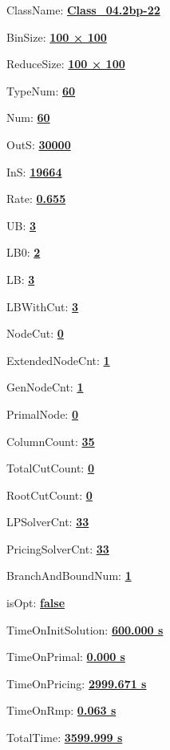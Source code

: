 \documentclass[11pt]{article}
\begin{document}
\pagestyle{empty}


ClassName: \underline{\textbf{Class_04.2bp-22}}
\par
BinSize: \underline{\textbf{100 × 100}}
\par
ReduceSize: \underline{\textbf{100 × 100}}
\par
TypeNum: \underline{\textbf{60}}
\par
Num: \underline{\textbf{60}}
\par
OutS: \underline{\textbf{30000}}
\par
InS: \underline{\textbf{19664}}
\par
Rate: \underline{\textbf{0.655}}
\par
UB: \underline{\textbf{3}}
\par
LB0: \underline{\textbf{2}}
\par
LB: \underline{\textbf{3}}
\par
LBWithCut: \underline{\textbf{3}}
\par
NodeCut: \underline{\textbf{0}}
\par
ExtendedNodeCnt: \underline{\textbf{1}}
\par
GenNodeCnt: \underline{\textbf{1}}
\par
PrimalNode: \underline{\textbf{0}}
\par
ColumnCount: \underline{\textbf{35}}
\par
TotalCutCount: \underline{\textbf{0}}
\par
RootCutCount: \underline{\textbf{0}}
\par
LPSolverCnt: \underline{\textbf{33}}
\par
PricingSolverCnt: \underline{\textbf{33}}
\par
BranchAndBoundNum: \underline{\textbf{1}}
\par
isOpt: \underline{\textbf{false}}
\par
TimeOnInitSolution: \underline{\textbf{600.000 s}}
\par
TimeOnPrimal: \underline{\textbf{0.000 s}}
\par
TimeOnPricing: \underline{\textbf{2999.671 s}}
\par
TimeOnRmp: \underline{\textbf{0.063 s}}
\par
TotalTime: \underline{\textbf{3599.999 s}}
\par
\newpage
\end{document}
